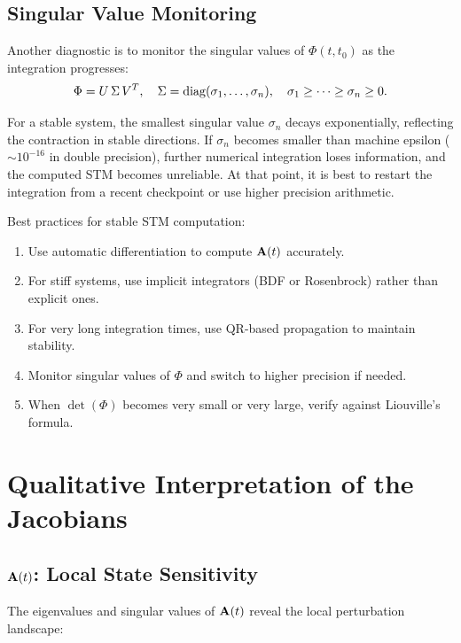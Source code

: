\subsection{Singular Value Monitoring}

Another diagnostic is to monitor the singular values of $\Phi(t,t_0)$ as the integration progresses:
\begin{equation}
\Phi = U\,\Sigma\,V^T, \quad \Sigma = \operatorname{diag}(\sigma_1, \ldots, \sigma_n), \quad \sigma_1 \geq \cdots \geq \sigma_n \geq 0.
\label{eq:ch2:svd-stm}
\end{equation}

For a stable system, the smallest singular value $\sigma_n$ decays exponentially, reflecting the contraction
in stable directions. If $\sigma_n$ becomes smaller than machine epsilon ($\sim 10^{-16}$ in double precision),
further numerical integration loses information, and the computed STM becomes unreliable. At that point, it is best
to restart the integration from a recent checkpoint or use higher precision arithmetic.

\begin{designbox}
Best practices for stable STM computation:
\begin{enumerate}
\item Use automatic differentiation to compute $\mathbf{A}(t)$ accurately.
\item For stiff systems, use implicit integrators (BDF or Rosenbrock) rather than explicit ones.
\item For very long integration times, use QR-based propagation to maintain stability.
\item Monitor singular values of $\Phi$ and switch to higher precision if needed.
\item When $\det(\Phi)$ becomes very small or very large, verify against Liouville's formula.
\end{enumerate}
\end{designbox}


\section{Qualitative Interpretation of the Jacobians}

\subsection{$\mathbf{A}(t)$: Local State Sensitivity}

The eigenvalues and singular values of $\mathbf{A}(t)$ reveal the local perturbation landscape:

